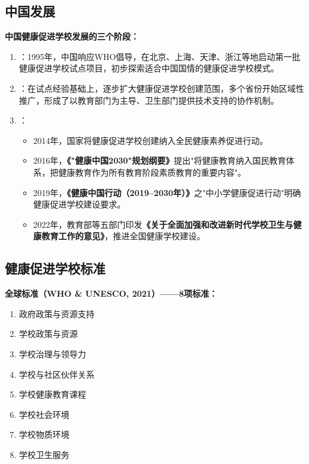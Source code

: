 \subsection{中国发展}

\begin{keybox}
\textbf{中国健康促进学校发展的三个阶段：}

\begin{enumerate}[leftmargin=*]
    \item {}：1995年，中国响应WHO倡导，在北京、上海、天津、浙江等地启动第一批健康促进学校试点项目，初步探索适合中国国情的健康促进学校模式。

    \item {}：在试点经验基础上，逐步扩大健康促进学校创建范围，多个省份开始区域性推广，形成了以教育部门为主导、卫生部门提供技术支持的协作机制。

    \item {}：
    \begin{itemize}
        \item 2014年，国家将健康促进学校创建纳入全民健康素养促进行动。
        \item 2016年，\textbf{《"健康中国2030"规划纲要》}提出"将健康教育纳入国民教育体系，把健康教育作为所有教育阶段素质教育的重要内容"。
        \item 2019年，\textbf{《健康中国行动（2019--2030年）》}之"中小学健康促进行动"明确健康促进学校建设要求。
        \item 2022年，教育部等五部门印发\textbf{《关于全面加强和改进新时代学校卫生与健康教育工作的意见》}，推进全国健康学校建设。
    \end{itemize}
\end{enumerate}
\end{keybox}

\subsection{健康促进学校标准}

\begin{keybox}
\textbf{全球标准（WHO \& UNESCO, 2021）——8项标准：}
\begin{enumerate}[leftmargin=*]
    \item 政府政策与资源支持
    \item 学校政策与资源
    \item 学校治理与领导力
    \item 学校与社区伙伴关系
    \item 学校健康教育课程
    \item 学校社会环境
    \item 学校物质环境
    \item 学校卫生服务
\end{enumerate}
\end{keybox}


